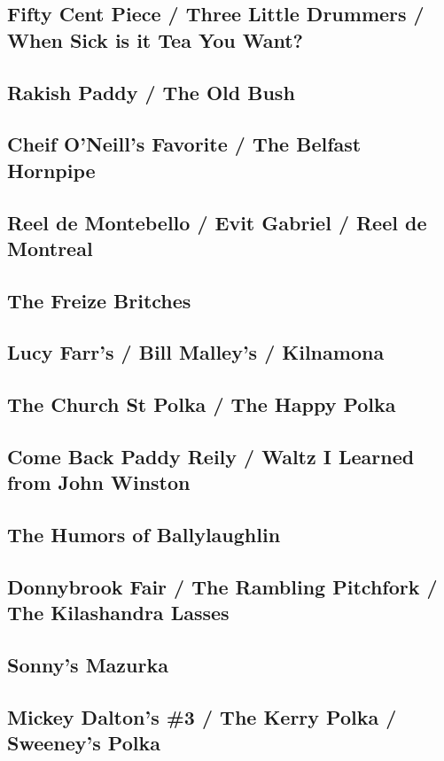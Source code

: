 \documentclass[11pt,letterpaper]{article}
\begin{document}
\subsection*{Fifty Cent Piece / Three Little Drummers / When Sick is it Tea You Want?} 
\subsection*{Rakish Paddy / The Old Bush} 
\subsection*{Cheif O'Neill's Favorite / The Belfast Hornpipe} 
\subsection*{Reel de Montebello / Evit Gabriel / Reel de Montreal}
\subsection*{The Freize Britches}
\subsection*{Lucy Farr's / Bill Malley's / Kilnamona}
\subsection*{The Church St Polka / The Happy Polka}
\subsection*{Come Back Paddy Reily / Waltz I Learned from John Winston}
\subsection*{The Humors of Ballylaughlin}
\subsection*{Donnybrook Fair / The Rambling Pitchfork / The Kilashandra Lasses}
\subsection*{Sonny's Mazurka}
\subsection*{Mickey Dalton's \#3 / The Kerry Polka / Sweeney's Polka}
\end{document}
